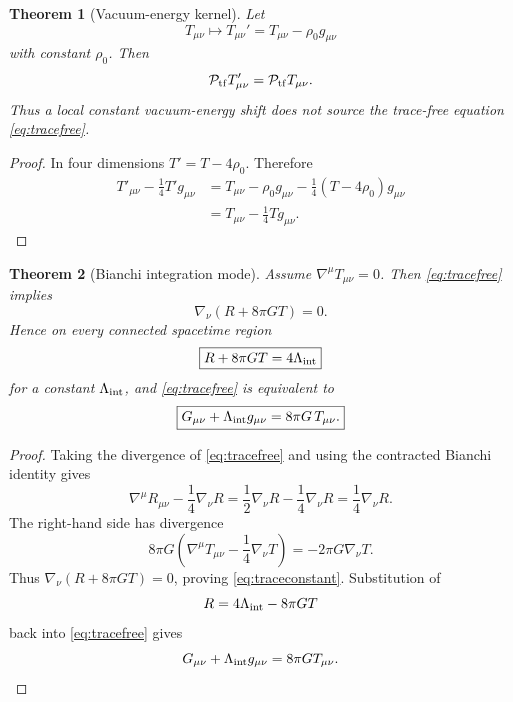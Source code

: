 \documentclass[aps,prd,reprint,nofootinbib,superscriptaddress,floatfix]{revtex4-2}
\numberwithin{equation}{section}
\theoremstyle{definition}
\theoremstyle{plain}
\newtheorem{theorem}{Theorem}[section]
\newcommand{\Ptr}{\mathcal P_{\rm tf}}
\begin{document}
\begin{theorem}[Vacuum-energy kernel]\label{thm:vacuum-kernel}
Let
\begin{equation}
T_{\mu\nu}\longmapsto T_{\mu\nu}'=T_{\mu\nu}-\rho_0g_{\mu\nu}
\end{equation}
with constant \(\rho_0\).  Then
\begin{equation}
\Ptr T'_{\mu\nu}=\Ptr T_{\mu\nu}.
\end{equation}
Thus a local constant vacuum-energy shift does not source the trace-free equation \eqref{eq:tracefree}.
\end{theorem}

\begin{proof}
In four dimensions \(T'=T-4\rho_0\).  Therefore
\begin{align}
T'_{\mu\nu}-\frac14T'g_{\mu\nu}
&=
T_{\mu\nu}-\rho_0g_{\mu\nu}
-\frac14(T-4\rho_0)g_{\mu\nu}\\
&=
T_{\mu\nu}-\frac14Tg_{\mu\nu}.
\end{align}
\end{proof}

\begin{theorem}[Bianchi integration mode]\label{thm:bianchi-integration}
Assume \(\nabla^\mu T_{\mu\nu}=0\).  Then \eqref{eq:tracefree} implies
\begin{equation}
\nabla_\nu(R+8\pi G T)=0.
\end{equation}
Hence on every connected spacetime region
\begin{equation}
\boxed{
R+8\pi G T=4\Lambda_{\rm int}
}
\label{eq:traceconstant}
\end{equation}
for a constant \(\Lambda_{\rm int}\), and \eqref{eq:tracefree} is equivalent to
\begin{equation}
\boxed{
G_{\mu\nu}+\Lambda_{\rm int}g_{\mu\nu}
=
8\pi G\,T_{\mu\nu}.
}
\label{eq:einstein-int}
\end{equation}
\end{theorem}

\begin{proof}
Taking the divergence of \eqref{eq:tracefree} and using the contracted Bianchi identity gives
\[
\nabla^\mu R_{\mu\nu}-\frac14\nabla_\nu R
=
\frac12\nabla_\nu R-\frac14\nabla_\nu R
=
\frac14\nabla_\nu R.
\]
The right-hand side has divergence
\[
8\pi G\left(\nabla^\mu T_{\mu\nu}-\frac14\nabla_\nu T\right)
=
-2\pi G\nabla_\nu T.
\]
Thus \(\nabla_\nu(R+8\pi GT)=0\), proving \eqref{eq:traceconstant}.  Substitution of
\[
R=4\Lambda_{\rm int}-8\pi GT
\]
back into \eqref{eq:tracefree} gives
\[
G_{\mu\nu}+\Lambda_{\rm int}g_{\mu\nu}=8\pi GT_{\mu\nu}.
\]
\end{proof}
\end{document}
